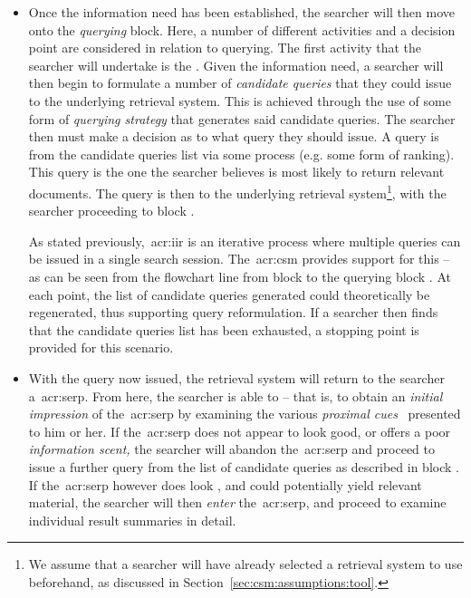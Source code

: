 \begin{itemize}
    
    \item[\blueboxbold{B}]{ Once the information need has been established, the searcher will then move onto the \emph{querying} block. Here, a number of different activities and a decision point are considered in relation to querying. The first activity that the searcher will undertake is the . Given the information need, a searcher will then begin to formulate a number of \emph{candidate queries} that they could issue to the underlying retrieval system. This is achieved through the use of some form of \emph{querying strategy} that generates said candidate queries. The searcher then must make a decision as to what query they should issue. A query is  from the candidate queries list via some process (e.g. some form of ranking). This query is the one the searcher believes is most likely to return relevant documents. The query is then  to the underlying retrieval system\footnote{We assume that a searcher will have already selected a retrieval system to use beforehand, as discussed in Section~\ref{sec:csm:assumptions:tool}.}, with the searcher proceeding to block .
    
    As stated previously,~\gls{acr:iir} is an iterative process where multiple queries can be issued in a single search session. The~\gls{acr:csm} provides support for this -- as can be seen from the flowchart line from block  to the querying block . At each point, the list of candidate queries generated could theoretically be regenerated, thus supporting query reformulation. If a searcher then finds that the candidate queries list has been exhausted, a stopping point is provided for this scenario.}
        
    \item[\blueboxbold{C}]{ With the query now issued, the retrieval system will return to the searcher a~\gls{acr:serp}. From here, the searcher is able to  -- that is, to obtain an \emph{initial impression} of the~\gls{acr:serp} by examining the various \emph{proximal cues}~\citep{chi2001information_scent} presented to him or her. If the~\gls{acr:serp} does not appear to look good, or offers a poor \emph{information scent,} the searcher will abandon the~\gls{acr:serp} and proceed to issue a further query from the list of candidate queries as described in block . If the~\gls{acr:serp} however does look , and could potentially yield relevant material, the searcher will then \emph{enter} the~\gls{acr:serp}, and proceed to examine individual result summaries in detail.}
    

\end{itemize}
